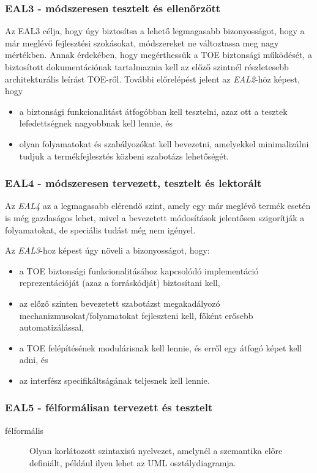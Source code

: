 \subsubsection{EAL3 - módszeresen tesztelt és ellenőrzött}
Az EAL3 célja, hogy úgy biztosítsa a lehető legmagasabb bizonyosságot, hogy a már meglévő
fejlesztési szokásokat, módszereket ne változtassa meg nagy mértékben.
Annak érdekében, hogy megérthessük a TOE biztonsági működését, a biztosított dokumentációnak
tartalmaznia kell az előző szintnél részletesebb architekturális leírást TOE-ről.
További előrelépést jelent az \emph{EAL2}-höz képest, hogy
\begin{itemize}
    \item a biztonsági funkcionalitást átfogóbban kell tesztelni, azaz ott a tesztek lefedettségnek
        nagyobbnak kell lennie, és
    \item olyan folyamatokat és szabályozókat kell bevezetni, amelyekkel minimalizálni tudjuk a
        termékfejlesztés közbeni szabotázs lehetőségét.
\end{itemize}

\subsubsection{EAL4 - módszeresen tervezett, tesztelt és lektorált}
Az \emph{EAL4} az a legmagasabb elérendő szint, amely egy már meglévő termék esetén is még
gazdaságos lehet, mivel a bevezetett módosítások jelentősen szigorítják a folyamatokat, de speciális
tudást még nem igényel.

Az \emph{EAL3}-hoz képest úgy növeli a bizonyosságot, hogy:
\begin{itemize}
    \item a TOE biztonsági funkcionalitásához kapcsolódó implementáció reprezentációját
        (azaz a forráskódját) biztosítani kell,
    \item az előző szinten bevezetett szabotázst megakadályozó mechanizmusokat/folyamatokat
        fejleszteni kell, főként erősebb automatizálással,
    \item a TOE felépítésének modulárisnak kell lennie, és erről egy átfogó képet kell adni, és
    \item az interfész specifikáltságának teljesnek kell lennie.
\end{itemize}

\subsubsection{EAL5 - félformálisan tervezett és tesztelt}
\begin{description}
    \item[félformális]{Olyan korlátozott szintaxisú nyelvezet, amelynél a szemantika előre
        definiált, például ilyen lehet az UML osztálydiagramja.}
\end{description}

